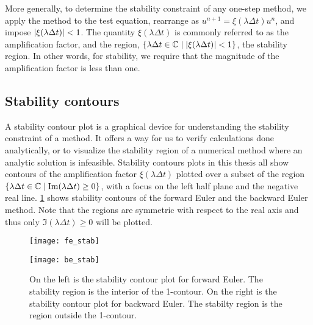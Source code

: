 More generally, to determine the stability constraint of any one-step method, we apply the method to the test equation, rearrange as $u^{n+1} = \xi(\lambda\Delta t) u^n$, and impose $\left|\xi(\lambda\Delta t)\right| < 1$. The quantity $\xi(\lambda\Delta t)$ is commonly referred to as the amplification factor, and the region, $\{\lambda\Delta t \in \mathbb{C} \mid \left|\xi(\lambda\Delta t)\right| < 1\}$, the stability region. In other words, for stability, we require that the magnitude of the amplification factor is less than one.
 
\subsection{Stability contours}
A stability contour plot is a graphical device for understanding the stability constraint of a method. It offers a way for us to verify calculations done analytically, or to visualize the stability region of a numerical method where an analytic solution is infeasible. Stability contours plots in this thesis all show contours of the amplification factor $\xi(\lambda\Delta t)$ plotted over a subset of the region $\{\lambda\Delta t \in \mathbb{C} \mid \operatorname{Im}(\lambda\Delta t) \geq 0\}$, with a focus on the left half plane and the negative real line. \cref{fig:FE BE stab cont} shows stability contours of the forward Euler and the backward Euler method. Note that the regions are symmetric with respect to the real axis and thus only $\Im(\lambda\Delta t) \geq 0$ will be plotted.

\begin{figure}[htb!]
	\centering
\begin{minipage}{0.45\textwidth}
\texttt{[image: fe\_stab]}
\end{minipage}
\begin{minipage}{0.45\textwidth}
\texttt{[image: be\_stab]}
\end{minipage}
\caption[Examples of stability contour plots.]{On the left is the stability contour plot for forward Euler. The stability region is the interior of the 1-contour. On the right is the stability contour plot for backward Euler. The stabilty region is the region outside the 1-contour.}
\label{fig:FE BE stab cont}
\end{figure}

